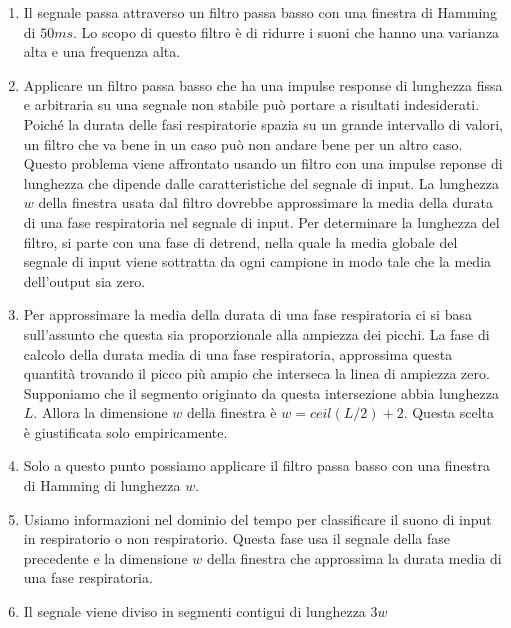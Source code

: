 \begin{frame}
\begin{enumerate}
      \item
	Il segnale passa attraverso un filtro passa basso con una finestra di Hamming di $50ms$. 
	Lo scopo di questo filtro \`e di ridurre i suoni che hanno una varianza alta e una frequenza alta.
      \item
	Applicare un filtro passa basso che ha una impulse response di lunghezza fissa e arbitraria su una segnale non stabile pu\`o portare a risultati indesiderati. 
	Poich\'e la durata delle fasi respiratorie spazia su un grande intervallo di valori, un filtro che va bene in un caso pu\`o non andare bene per un altro caso. 
	Questo problema viene affrontato usando un filtro con una impulse reponse di lunghezza che dipende dalle caratteristiche del segnale di input. 
	La lunghezza $w$ della finestra usata dal filtro dovrebbe approssimare la media della durata di una fase respiratoria nel segnale di input. 
	Per determinare la lunghezza del filtro, si parte con una fase di detrend, nella quale la media globale del segnale di input viene sottratta da ogni campione in modo tale che la media dell'output sia zero. 
      \item
	Per approssimare la media della durata di una fase respiratoria ci si basa sull'assunto che questa sia proporzionale alla ampiezza dei picchi. 
	La fase di calcolo della durata media di una fase respiratoria, approssima questa quantit\`a trovando il picco pi\`u ampio che interseca la linea di ampiezza zero. 
	Supponiamo che il segmento originato da questa intersezione abbia lunghezza $L$. 
	Allora la dimensione $w$ della finestra \`e $w=ceil(L/2)+2$. Questa scelta \`e giustificata solo empiricamente.
      \item
	Solo a questo punto possiamo applicare il filtro passa basso con una finestra di Hamming di lunghezza $w$. 
      \item	
	Usiamo informazioni nel dominio del tempo per classificare il suono di input in respiratorio o non respiratorio. 
	Questa fase usa il segnale della fase precedente e la dimensione $w$ della finestra che approssima la durata media di una fase respiratoria.
      \item
	Il segnale viene diviso in segmenti contigui di lunghezza $3w$ 

\end{enumerate}
\end{frame}
